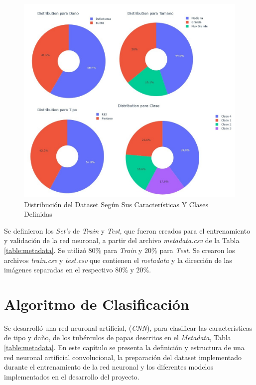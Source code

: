 \begin{figure}[ht]
	\centering
	\includegraphics[scale=0.4]{Figs/Distribucion.jpg}
	\caption{Distribución del Dataset Según Sus Características Y Clases Definidas}
	\label{fig:distribuciontipo}
\end{figure}

Se definieron los \textit{Set's} de \textit{Train} y \textit{Test}, que fueron creados para el entrenamiento y validación de la red neuronal, a partir del archivo \textit{metadata.csv} de la Tabla \ref{table:metadata}. Se utilizó $80\%$ para \textit{Train} y $20\%$ para \textit{Test}. Se crearon los archivos \textit{train.csv} y \textit{test.csv} que contienen el \textit{metadata} y la dirección de las imágenes separadas en el respectivo $80\%$ y $20\%$.



\chapter{Algoritmo de Clasificación}

Se desarrolló una red neuronal artificial, (\textit{CNN}), para clasificar las características de tipo y daño, de los tubérculos de papas descritos en el \textit{Metadata}, Tabla \ref{table:metadata}. En este capítulo se presenta la definición y estructura de una red neuronal artificial convolucional, la preparación del dataset implementado durante el entrenamiento de la red neuronal y los diferentes modelos implementados en el desarrollo del proyecto.

